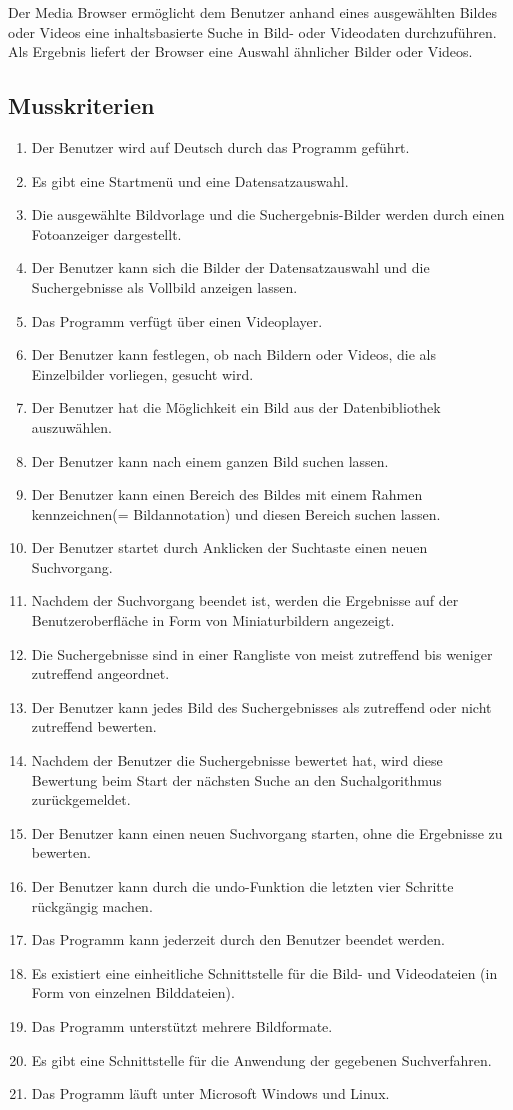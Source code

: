Der Media Browser ermöglicht dem Benutzer anhand eines ausgewählten Bildes oder Videos eine inhaltsbasierte Suche in Bild- oder Videodaten durchzuführen. Als Ergebnis liefert der Browser eine Auswahl ähnlicher Bilder oder Videos.
\subsection{Musskriterien}
\begin{enumerate} [label=\bfseries /MK \arabic*0/]
\item Der Benutzer wird auf Deutsch durch das Programm geführt.
\item Es gibt eine Startmenü und eine Datensatzauswahl.
\item Die ausgewählte Bildvorlage und die Suchergebnis-Bilder werden durch einen Fotoanzeiger dargestellt.
\item Der Benutzer kann sich die Bilder der Datensatzauswahl und die Suchergebnisse als Vollbild anzeigen lassen.
\item Das Programm verfügt über einen Videoplayer.
\item Der Benutzer kann festlegen, ob nach Bildern oder Videos, die als Einzelbilder vorliegen, gesucht wird.
\item Der Benutzer hat die Möglichkeit ein Bild aus der Datenbibliothek auszuwählen.
\item Der Benutzer kann nach einem ganzen Bild suchen lassen.
\item Der Benutzer kann einen Bereich des Bildes mit einem Rahmen kennzeichnen(= Bildannotation) und diesen Bereich suchen lassen.
\item Der Benutzer startet durch Anklicken der Suchtaste einen neuen Suchvorgang.
\item Nachdem der Suchvorgang beendet ist, werden die Ergebnisse auf der Benutzeroberfläche in Form von Miniaturbildern angezeigt.
\item Die Suchergebnisse sind in einer Rangliste von meist zutreffend bis weniger zutreffend angeordnet.
\item Der Benutzer kann jedes Bild des Suchergebnisses als zutreffend oder nicht zutreffend bewerten.
\item Nachdem der Benutzer die Suchergebnisse bewertet hat, wird diese Bewertung beim Start der nächsten Suche an den Suchalgorithmus zurückgemeldet.
\item Der Benutzer kann einen neuen Suchvorgang starten, ohne die Ergebnisse zu bewerten.
\item Der Benutzer kann durch die undo-Funktion die letzten vier Schritte rückgängig machen.
\item Das Programm kann jederzeit durch den Benutzer beendet werden.
\item Es existiert eine einheitliche Schnittstelle für die Bild- und Videodateien (in Form von einzelnen Bilddateien).
\item Das Programm unterstützt mehrere Bildformate.
\item Es gibt eine Schnittstelle für die Anwendung der gegebenen Suchverfahren.
\item Das Programm läuft unter Microsoft Windows und Linux.
\end{enumerate}
